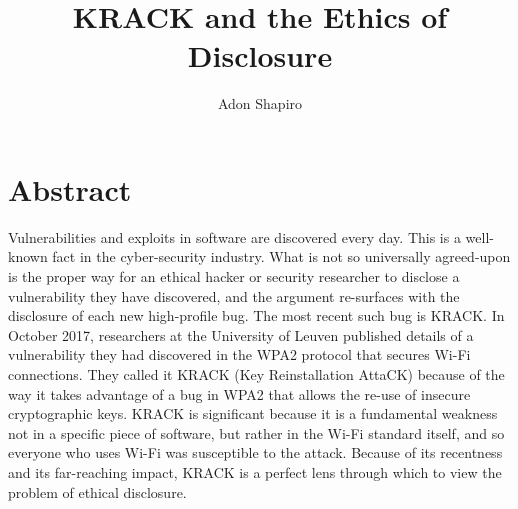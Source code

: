 \documentclass[12pt]{article}
\title{KRACK and the Ethics of Disclosure}
\author{Adon Shapiro}
\begin{document}
\maketitle
\section*{\hfil Abstract \hfil}
Vulnerabilities and exploits in software are discovered every day. This is a
well-known fact in the cyber-security industry. What is not so universally
agreed-upon is the proper way for an ethical hacker or security researcher to
disclose a vulnerability they have discovered, and the argument re-surfaces
with the disclosure of each new high-profile bug. The most recent such bug 
is KRACK.
In October 2017, researchers at the University of Leuven published details
of a vulnerability they had discovered in the WPA2 protocol that secures Wi-Fi
connections. They called it KRACK (Key Reinstallation AttaCK) because of the
way it takes advantage of a bug in WPA2 that allows the re-use of insecure
cryptographic keys. KRACK is significant because it is a fundamental weakness
not in a specific piece of software, but rather in the Wi-Fi standard itself,
and so everyone who uses Wi-Fi was susceptible to the attack. Because of its
recentness and its far-reaching impact, KRACK is a perfect lens through which
to view the problem of ethical disclosure.
\end{document}
